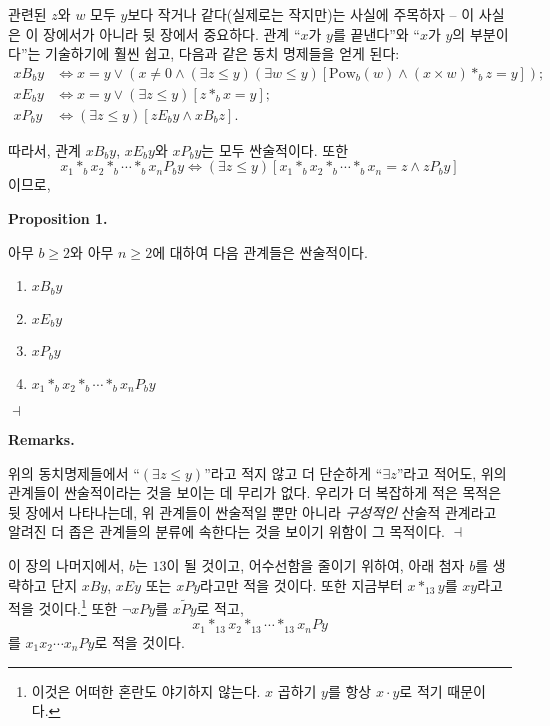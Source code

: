\documentclass[12pt]{paper}
\newenvironment{context}[1][]
{ \noindent \textbf{{#1}.}
}
{ \hfill $ \dashv $
}
\begin{document}
  관련된 $z$와 $w$ 모두 $y$보다 작거나 같다(실제로는 작지만)는 사실에 주목하자 -- 이 사실은 이 장에서가 아니라 뒷 장에서 중요하다.
  관계 ``$x$가 $y$를 끝낸다''와 ``$x$가 $y$의 부분이다''는 기술하기에 훨씬 쉽고, 다음과 같은 동치 명제들을 얻게 된다:
  \begin{align*}
    x B_{b} y & \iff x = y \lor \left( x \ne 0 \land \left( \exists z \le y \right) \left( \exists w \le y \right) \left[ \mathrm{Pow}_{b} \left( w \right) \land \left( x \times w \right) *_{b} z = y \right] \right) ; \\
    x E_{b} y & \iff x = y \lor \left( \exists z \le y \right) \left[ z *_{b} x = y \right] ; \\
    x P_{b} y & \iff \left( \exists z \le y \right) \left[ z E_{b} y \land x B_{b} z \right] .
  \end{align*}

  따라서, 관계 $x B_{b} y$, $x E_{b} y$와 $x P_{b} y$는 모두 싼술적이다. 또한
  $$ x_{1} *_{b} x_{2} *_{b} \cdots *_{b} x_{n} P_{b} y \iff \left( \exists z \le y \right) \left[ x_{1} *_{b} x_{2} *_{b} \cdots *_{b} x_{n} = z \land z P_{b} y \right] $$이므로,

  \begin{context}[Proposition 1]
    아무 $b \ge 2$와 아무 $n \ge 2$에 대하여 다음 관계들은 싼술적이다. 
    \begin{enumerate}
      \item $x B_{b} y$
      \item $x E_{b} y$
      \item $x P_{b} y$
      \item $x_{1} *_{b} x_{2} *_{b} \cdots *_{b} x_{n} P_{b} y$
    \end{enumerate} 
  \end{context}

  \begin{context}[Remarks]
    위의 동치명제들에서 ``$\left( \exists z \le y \right)$''라고 적지 않고 더 단순하게 ``$\exists z$''라고 적어도,
    위의 관계들이 싼술적이라는 것을 보이는 데 무리가 없다. 우리가 더 복잡하게 적은 목적은 뒷 장에서 나타나는데,
    위 관계들이 싼술적일 뿐만 아니라 \textit{구성적인} 산술적 관계라고 알려진 더 좁은 관계들의 분류에 속한다는 것을 보이기 위함이 그 목적이다.
  \end{context}

  이 장의 나머지에서, $b$는 $13$이 될 것이고, 어수선함을 줄이기 위하여, 아래 첨자 $b$를 생략하고 단지 $x B y$, $x E y$ 또는 $x P y$라고만 적을 것이다.
  또한 지금부터 $x *_{13} y$를 $x y$라고 적을 것이다.\footnote
  {
    이것은 어떠한 혼란도 야기하지 않는다. $x$ 곱하기 $y$를 항상 $x \cdot y$로 적기 때문이다.
  }
  또한 $\lnot x P y$를 $x \tilde{P} y$로 적고, $$ x_1 *_{13} x_2 *_{13} \cdots *_{13} x_{n} P y $$를 $x_1 x_2 \cdots x_{n} P y$로 적을 것이다. 
\end{document}
